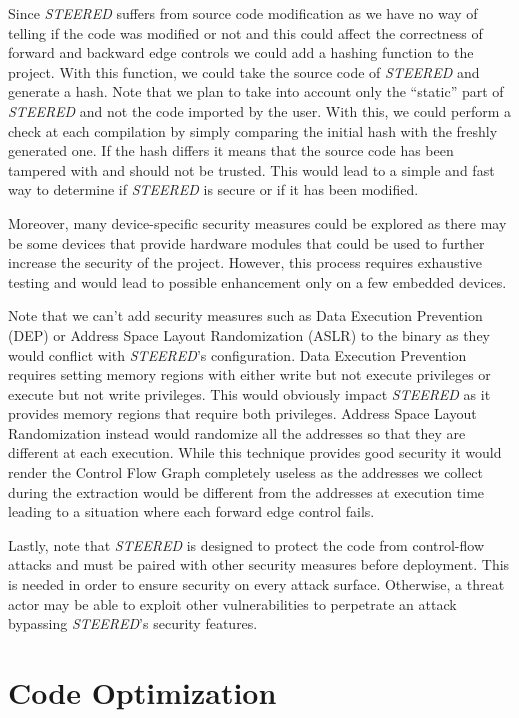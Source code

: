 Since \textit{STEERED} suffers from source code modification as we have no way of
telling if the code was modified or not and this could affect the correctness of
forward and backward edge controls we could add a hashing function to the project.
With this function, we could take the source code of \textit{STEERED} and
generate a hash. Note that we plan to take into account only the ``static'' part
of \textit{STEERED} and not the code imported by the user. With this, we could
perform a check at each compilation by simply comparing the initial hash with
the freshly generated one. If the hash differs it means that the source code has
been tampered with and should not be trusted. This would lead to a simple and
fast way to determine if \textit{STEERED} is secure or if it has been modified.

Moreover, many device-specific security measures could be explored as there may
be some devices that provide hardware modules that could be used to further
increase the security of the project. However, this process requires exhaustive
testing and would lead to possible enhancement only on a few embedded devices.

Note that we can't add security measures such as Data Execution Prevention (DEP)
or Address Space Layout Randomization (ASLR) to the binary as they would
conflict with \textit{STEERED}'s configuration. Data Execution Prevention
requires setting memory regions with either write but not execute privileges or
execute but not write privileges. This would obviously impact \textit{STEERED}
as it provides memory regions that require both privileges. Address Space Layout
Randomization instead would randomize all the addresses so that they are different
at each execution. While this technique provides good security it would render
the Control Flow Graph completely useless as the addresses we collect during the
extraction would be different from the addresses at execution time leading to a
situation where each forward edge control fails.

Lastly, note that \textit{STEERED} is designed to protect the code from control-flow
attacks and must be paired with other security measures before deployment. This is
needed in order to ensure security on every attack surface. Otherwise, a threat actor
may be able to exploit other vulnerabilities to perpetrate an attack bypassing \textit{STEERED}'s
security features.

\section{Code Optimization}
\label{sec:future_optimization}


